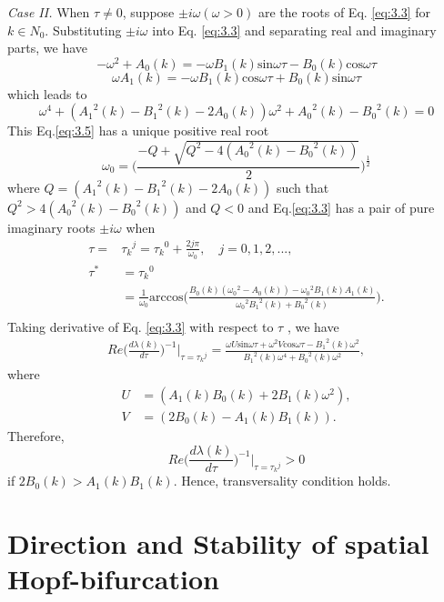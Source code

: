 \documentclass[10pt]{amsart}
\theoremstyle{definition}
\begin{document}
{\it Case II.} When $\tau \neq 0$, suppose  $\pm i\omega (\omega>0)$ are the roots of Eq. \eqref{eq:3.3}  for $k \in N_0$. Substituting $\pm i\omega$ into Eq. \eqref{eq:3.3}  and separating real and imaginary parts, we have
$$-\omega^2+A_0(k)=-\omega B_1(k) \mbox{sin}\omega \tau - B_0(k) \mbox{cos} \omega \tau$$
$$\omega A_1(k)=-\omega B_1(k) \mbox{cos}\omega \tau+B_0(k) \mbox{sin}\omega \tau$$
which leads to
\begin{equation}\label{eq:3.5}
\omega^4+({A_1}^2(k)-{B_1}^2(k)-2A_0(k)) \omega^2 + {A_0}^2(k)-{B_0}^2(k)=0
\end{equation}
This Eq.\eqref{eq:3.5} has a unique positive real root\\
$$\omega_0=\Bigg(\frac{-Q + \sqrt{{Q^2-4({A_0}^2(k)-{B_0}^2(k))}}}{2}\Bigg)^{\frac{1}{2}}$$
where $Q=({A_1}^2(k)-{B_1}^2(k)-2A_0(k))$
such that $Q^2>4({A_0}^2(k)-{B_0}^2(k))$ and $Q<0$ and Eq.\eqref{eq:3.3}  has a pair of pure imaginary roots $\pm i\omega$ when
\begin{align*}
\tau=&{\tau_k}^j={\tau_k}^0+\frac{2j\pi}{\omega_0}, \quad j=0,1,2,...,\\
\tau^*&={\tau_k}^0\\
&=\frac{1}{\omega_0}\mbox{arccos}\Bigg(\frac{{B_0}(k)({\omega_0}^2-{A_0}(k))-{\omega_0}^2{B_1}(k){A_1}(k)}{{\omega_0}^2 {B_1}^2(k)+{B_0}^2(k)}\Bigg). \\
\end{align*}
Taking derivative of Eq. \eqref{eq:3.3}  with respect to $\tau$ , we have\\
\begin{align*}
Re\Bigg(\frac{d\lambda(k)}{d\tau}\Bigg)^{-1}\Bigg|_{\tau={\tau_k}^j}=\frac{\omega U\mbox{sin}\omega\tau+\omega^2 V\mbox{cos}\omega\tau-{B_1}^2(k)\omega^2}{{B_1}^2(k)\omega^4+{B_0}^2(k)\omega^2},
\end{align*}
where\\
\begin{align*}
U&=(A_1(k)B_0(k)+2B_1(k)\omega^2),\\
V&=(2B_0(k)-A_1(k)B_1(k)).
\end{align*}
Therefore,\\
$$Re\Bigg(\frac{d\lambda(k)}{d\tau}\Bigg)^{-1}\Bigg|_{\tau={\tau_k}^j}>0$$
if $2B_0(k)>A_1(k)B_1(k)$. Hence, transversality condition holds.

\section{Direction and Stability of spatial Hopf-bifurcation}\label{sec:4}
\end{document}
